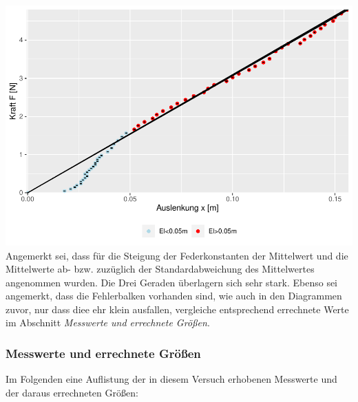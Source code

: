 \documentclass[
]{article}
\begin{document}
\includegraphics{DehnbareStoffe_files/figure-latex/unnamed-chunk-10-1.pdf}
Angemerkt sei, dass für die Steigung der Federkonstanten der Mittelwert
und die Mittelwerte ab- bzw. zuzüglich der Standardabweichung des
Mittelwertes angenommen wurden. Die Drei Geraden überlagern sich sehr
stark. Ebenso sei angemerkt, dass die Fehlerbalken vorhanden sind, wie
auch in den Diagrammen zuvor, nur dass diee ehr klein ausfallen,
vergleiche entsprechend errechnete Werte im Abschnitt
\textit{Messwerte und errechnete Größen}.

\hypertarget{messwerte-und-errechnete-gruxf6uxdfen}{%
\subsubsection{Messwerte und errechnete
Größen}\label{messwerte-und-errechnete-gruxf6uxdfen}}

Im Folgenden eine Auflistung der in diesem Versuch erhobenen Messwerte
und der daraus errechneten Größen:
\end{document}
